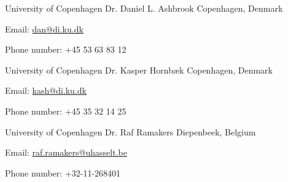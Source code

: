 \begin{cventries}
  \cventry
    {University of Copenhagen}
    {Dr. Daniel L. Ashbrook}
    {Copenhagen, Denmark}
    {}
    {
      \begin{cvitems}
        \item{Email: \href{mailto:dan@di.ku.dk}{dan@di.ku.dk}}
        \item{Phone number: +45 53 63 83 12}
      \end{cvitems}
      \vspace{1em}
    }

  \cventry
    {University of Copenhagen}
    {Dr. Kasper Hornb\ae k}
    {Copenhagen, Denmark}
    {}
    {
      \begin{cvitems}
        \item{Email: \href{mailto:kash@di.ku.dk}{kash@di.ku.dk}}
        \item{Phone number: +45 35 32 14 25}
      \end{cvitems}
      \vspace{1em}
    }

  \cventry
    {University of Copenhagen}
    {Dr. Raf Ramakers}
    {Diepenbeek, Belgium}
    {}
    {
      \begin{cvitems}
        \item{Email: \href{raf.ramakers@uhasselt.be}{raf.ramakers@uhasselt.be}}
        \item{Phone number: ​+32-11-268401}
      \end{cvitems}
      \vspace{1em}
    }

\end{cventries}
